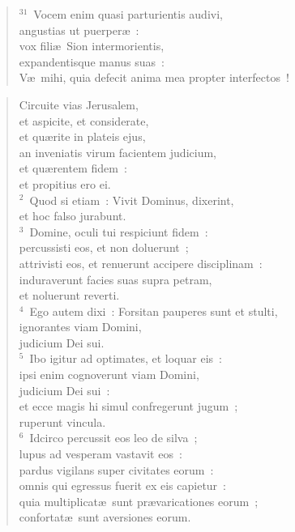 \begin{flushleft}
\begin{verse}
${}^{31}$~Vocem enim quasi parturientis audivi,\\ angustias ut puerper\ae~:\\ vox fili\ae\ Sion intermorientis,\\ expandentisque manus suas~:\\ V\ae\ mihi, quia defecit anima mea propter interfectos~!\end{verse}\end{flushleft}


\begin{flushleft}\begin{verse}\vspace{-19pt}Circuite vias Jerusalem,\\ et aspicite, et considerate,\\ et qu\ae rite in plateis ejus,\\ an inveniatis virum facientem judicium,\\ et qu\ae rentem fidem~:\\ et propitius ero ei.\\
${}^{2}$~Quod si etiam~: Vivit Dominus, dixerint,\\ et hoc falso jurabunt.\\
${}^{3}$~Domine, oculi tui respiciunt fidem~:\\ percussisti eos, et non doluerunt~;\\ attrivisti eos, et renuerunt accipere disciplinam~:\\ induraverunt facies suas supra petram,\\ et noluerunt reverti.\\
${}^{4}$~Ego autem dixi~: Forsitan pauperes sunt et stulti,\\ ignorantes viam Domini,\\ judicium Dei sui.\\
${}^{5}$~Ibo igitur ad optimates, et loquar eis~:\\ ipsi enim cognoverunt viam Domini,\\ judicium Dei sui~:\\ et ecce magis hi simul confregerunt jugum~;\\ ruperunt vincula.\\
${}^{6}$~Idcirco percussit eos leo de silva~;\\ lupus ad vesperam vastavit eos~:\\ pardus vigilans super civitates eorum~:\\ omnis qui egressus fuerit ex eis capietur~:\\ quia multiplicat\ae\ sunt pr\ae varicationes eorum~;\\ confortat\ae\ sunt aversiones eorum.\\

\end{verse}
\end{flushleft}
